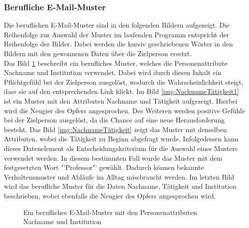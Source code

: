 		\subsubsection{Berufliche E-Mail-Muster}
		\label{subsubsec:beruflicheMuster}
		Die beruflichen E-Mail-Muster sind in den folgenden Bildern aufgezeigt. Die Reihenfolge zur Auswahl der Muster im laufenden Programm entspricht der Reihenfolge der Bilder. Dabei werden die kursiv geschriebenen Wörter in den Bildern mit den gewonnenen Daten über die Zielperson ersetzt.\\ 
		Das Bild \ref{img:NameInstitution} beschreibt ein berufliches Muster, welches die Personenattribute Nachname und Institution verwendet. Dabei wird durch diesen Inhalt ein Pflichtgefühl bei der Zielperson ausgelöst, wodurch die Wahrscheinlichkeit steigt, dass sie auf den entsprechenden Link klickt. Im Bild \ref{img:NachnameTätigkeit1} ist ein Muster mit den Attributen Nachname und Tätigkeit aufgezeigt. Hierbei wird die Neugier des Opfers angesprochen. Des Weiteren werden positive Gefühle bei der Zielperson ausgelöst, da die Chance auf eine neue Herausforderung besteht. Das Bild \ref{img:NachnameTätigkeit} zeigt das Muster mit denselben Attributen, wobei die Tätigkeit zu Beginn abgefragt wurde. Infolgedessen kann dieses Datenelement als Entscheidungskriterium für die Auswahl eines Musters verwendet werden. In diesem bestimmten Fall wurde das Muster mit dem festgesetzten Wort "'Professor"' gewählt. Dadurch können bekannte Verhaltensmuster und Abläufe im Alltag missbraucht werden. Im letzten Bild wird das berufliche Muster für die Daten Nachname, Tätigkeit und Institution beschrieben, wobei ebenfalls die Neugier des Opfers angesprochen wird.\\
			\begin{figure}[h!]
				\caption{Ein berufliches E-Mail-Muster mit den Personenattributen Nachname und Institution }
				\label{img:NameInstitution}
		\end{figure}
		

